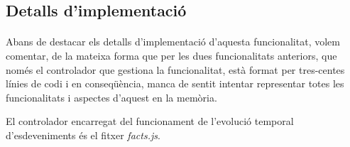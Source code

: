 \subsection{Detalls d'implementació}

    \paragraph{}
    Abans de destacar els detalls d'implementació d'aquesta funcionalitat, volem comentar, de la mateixa forma que per les dues funcionalitats anteriors, que només el controlador que gestiona la funcionalitat, està format per tres-centes línies de codi i en conseqüència, manca de sentit intentar representar totes les funcionalitats i aspectes d'aquest en la memòria.

    El controlador encarregat del funcionament de l'evolució temporal d'esdeveniments és el fitxer \emph{facts.js}.

    
    
    
